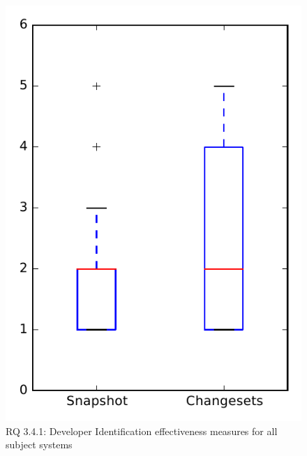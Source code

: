 
\begin{figure}
\centering
\includegraphics[height=0.4\textheight]{figures/dit_seed/rq1_overview}
\caption{RQ 3.4.1: Developer Identification effectiveness measures for all subject systems}
\label{fig:dit_seed:rq1:overview}
\end{figure}
